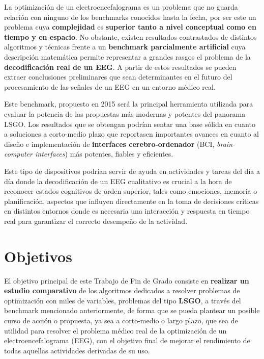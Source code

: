 La optimización de un electroencefalograma es un problema que no guarda relación con ninguno de los benchmarks conocidos hasta la fecha, por ser este un problema cuya \textbf{complejidad} es \textbf{superior tanto a nivel conceptual como en tiempo y en espacio}. No obstante, existen resultados contrastados de distintos algoritmos y técnicas frente a un \textbf{benchmark parcialmente artificial} cuya descripción matemática permite representar a grandes rasgos el problema de la \textbf{decodificación real de un EEG}. A partir de estos resultados se pueden extraer conclusiones preliminares que sean determinantes en el futuro del procesamiento de las señales de un EEG en un entorno médico real.

Este benchmark, propuesto en 2015\cite{CompetitionBigOpt} será la principal herramienta utilizada para evaluar la potencia de las propuestas más modernas y potentes del panorama LSGO. Los resultados que se obtengan podrían sentar una base sólida en cuanto a soluciones a corto-medio plazo que reportasen importantes avances en cuanto al diseño e implementación de \textbf{interfaces cerebro-ordenador} (BCI, \textit{brain-computer interfaces})\cite{BCI} más potentes, fiables y eficientes.

Este tipo de dispositivos podrían servir de ayuda en actividades y tareas del día a día donde la decodificación de un EEG cualitativo es crucial a la hora de reconocer estados cognitivos de orden superior, tales como emociones, memoria o planificación, aspectos que influyen directamente en la toma de decisiones críticas\cite{EvolutionaryBigOpt} en distintos entornos donde es necesaria una interacción y respuesta en tiempo real para garantizar el correcto desempeño de la actividad.

\section{Objetivos}

El objetivo principal de este Trabajo de Fin de Grado consiste en \textbf{realizar un estudio comparativo} de los algoritmos dedicados a resolver problemas de optimización con miles de variables, problemas del tipo \textbf{LSGO}, a través del benchmark mencionado anteriormente, de forma que se pueda plantear un posible curso de acción o propuesta, ya sea a corto-medio o largo plazo, que sea de utilidad para resolver el problema médico real de la optimización de un electroencefalograma (EEG), con el objetivo final de mejorar el rendimiento de todas aquellas actividades derivadas de su uso.

